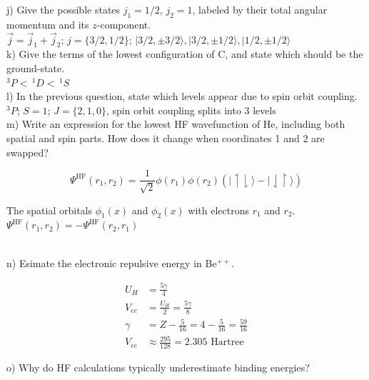 \documentclass{article}
\begin{document}
\noindent j) Give the possible states $j_1 = 1/2$, $j_2 = 1$, labeled by their total
angular momentum and its $z$-component.
\\

{\color{blue} $\vec{j}=\vec{j}_1+\vec{j}_2$; $j=\{3/2,1/2\}$;
  $|3/2,\pm 3/2\rangle, |3/2,\pm 1/2\rangle, |1/2,\pm 1/2\rangle$
}
\\

\noindent k) Give the terms of the lowest configuration of C, and state which should
be the ground-state.
\\

{\color{blue} $^3P <\, ^1D <\, ^1S$}
\\

\noindent l) In the previous question, state which levels appear due to spin orbit
coupling.
\\

{\color{blue} $^3P$; $S=1$; $J=\{2,1,0\}$, spin orbit coupling splits into 3 levels}
\\

\noindent m) Write an expression for the lowest HF wavefunction of He, including both
spatial and spin parts. How does it change when coordinates 1 and 2 are swapped?

{\color{blue}
  \begin{equation*}
    \Psi^{\text{HF}}(r_1,r_2) = \frac{1}{\sqrt{2}}\phi(r_1)
    \phi(r_2)(|\upharpoonleft\downharpoonright\rangle -
    |\downharpoonleft\upharpoonright\rangle)
  \end{equation*}
  
  The spatial orbitals $\phi_1(x)$ and $\phi_2(x)$ with
  electrons $r_1$ and $r_2$. $\Psi^{\text{HF}}(r_1,r_2) = -\Psi^{\text{HF}}(r_2,r_1)$
}\\

\noindent n) Esimate the electronic repulsive energy in Be$^{++}$.

{\color{blue}
  \begin{align*}
    U_H & = \frac{5\gamma}{4} \\
    V_{ee} & = \frac{U_H}{2} = \frac{5\gamma}{8} \\
    \gamma & = Z - \frac{5}{16} = 4 - \frac{5}{16} = \frac{59}{16} \\
    V_{ee} & \approx \frac{295}{128} = 2.305\text{ Hartree}
  \end{align*}
}   

\noindent o) Why do HF calculations typically underestimate binding energies?
\\
\end{document}
